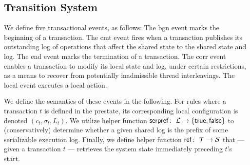 \subsection{Transition System}
\label{sec:transitionsystem}

We define five transactional events, as follows:
The {\sf bgn} event marks the beginning of a transaction.
The {\sf cmt} event fires when a transaction publishes its outstanding log of operations that affect the shared state to the shared state and log.
The {\sf end} event marks the termination of a transaction.
The {\sf corr} event enables a transaction to modify its local state and log, under certain restrictions, as a means to recover from potentially inadmissible thread interleavings.
The {\sf local} event executes a local action.

We define the semantics of these events in the following. For rules where a transaction $t$ is defined in the prestate, its corresponding local configuration is denoted $(c_t,\sigma_t,L_t)$. We utilize helper function ${\sf serpref} \colon\ {\cal L} \rightarrow \{ {\sf true},{\sf false} \}$ to (conservatively) determine whether a given shared log is the prefix of some serializable execution log. Finally, we define helper function
${\sf ref} \colon\ {\cal T} \rightarrow {\cal S}$ that --- given a transaction $t$ --- retrieves the system state immediately preceding $t$'s start.

